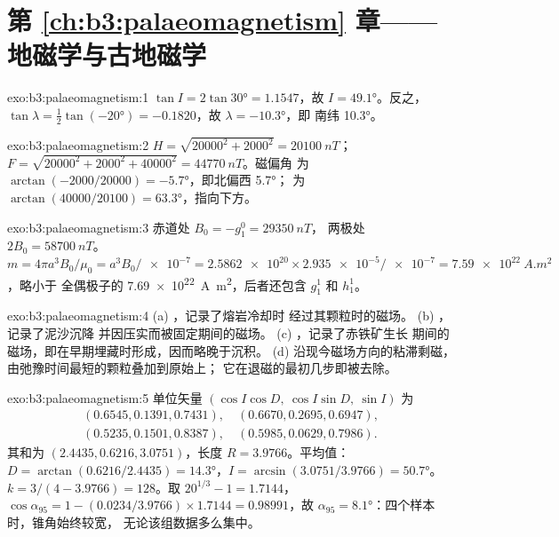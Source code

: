 \section*{第 \ref{ch:b3:palaeomagnetism} 章——地磁学与古地磁学}

\begin{solution}{exo:b3:palaeomagnetism:1}
$\tan I = 2\tan\ang{30} = 1.1547$，故 $I = \ang{49.1}$。反之，$\tan\lambda
= \tfrac12\tan(\ang{-20}) = -0.1820$，故 $\lambda = \ang{-10.3}$，即
南纬 \ang{10.3}。
\end{solution}

\begin{solution}{exo:b3:palaeomagnetism:2}
$H = \sqrt{20000^2 + 2000^2} = \qty{20100}{nT}$；
$F = \sqrt{20000^2 + 2000^2 + 40000^2} = \qty{44770}{nT}$。磁偏角
为 $\arctan(-2000/20000) = \ang{-5.7}$，即北偏西 \ang{5.7}；
为 $\arctan(40000/20100) = \ang{63.3}$，指向下方。
\end{solution}

\begin{solution}{exo:b3:palaeomagnetism:3}
赤道处 $B_0 = -g_1^0 = \qty{29350}{nT}$，
两极处 $2B_0 = \qty{58700}{nT}$。$m = 4\pi a^3B_0/\mu_0 = a^3B_0/\num{e-7} = \num{2.5862e20}\times
\num{2.935e-5}/\num{e-7} = \qty{7.59e22}{A.m^2}$，略小于
全偶极子的 \qty{7.69e22}{A.m^2}，后者还包含 $g_1^1$ 和 $h_1^1$。
\end{solution}

\begin{solution}{exo:b3:palaeomagnetism:4}
(a) ，记录了熔岩冷却时
经过其颗粒时的磁场。
(b) ，记录了泥沙沉降
并因压实而被固定期间的磁场。
(c) ，记录了赤铁矿生长
期间的磁场，即在早期埋藏时形成，因而略晚于沉积。
(d) 沿现今磁场方向的粘滞剩磁，由弛豫时间最短的颗粒叠加到原始上；
它在退磁的最初几步即被去除。
\end{solution}

\begin{solution}{exo:b3:palaeomagnetism:5}
单位矢量 $(\cos I\cos D,\ \cos I\sin D,\ \sin I)$ 为
\begin{gather*}
  (0.6545, 0.1391, 0.7431),\quad (0.6670, 0.2695, 0.6947),\\
  (0.5235, 0.1501, 0.8387),\quad (0.5985, 0.0629, 0.7986).
\end{gather*}
其和为 $(2.4435, 0.6216, 3.0751)$，长度 $R = 3.9766$。平均值：
$D = \arctan(0.6216/2.4435) = \ang{14.3}$，$I = \arcsin(3.0751/3.9766) =
\ang{50.7}$。$k = 3/(4 - 3.9766) = 128$。取 $20^{1/3} - 1 = 1.7144$，
$\cos\alpha_{95} = 1 - (0.0234/3.9766)\times1.7144 = 0.98991$，故
$\alpha_{95} = \ang{8.1}$：四个样本时，锥角始终较宽，
无论该组数据多么集中。
\end{solution}

